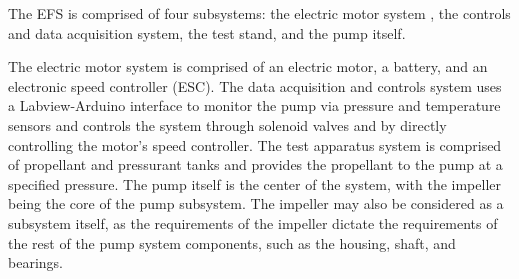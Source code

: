 \documentclass[11pt,twoside,a4paper,openright]{report}
\begin{document}
\begin{table}[!h]
\caption{Screening matrix for housing type selection}
\end{table}

\vspace{12pt}
The EFS is comprised of four subsystems: the electric motor system , the controls and data acquisition system, the test stand, and the pump itself. \par
\vspace{12pt}
	The electric motor system is comprised of an electric motor, a battery, and an electronic speed controller (ESC). The data acquisition and controls system uses a Labview-Arduino interface to monitor the pump via pressure and temperature sensors and controls the system through solenoid valves and by directly controlling the motor’s speed controller. The test apparatus system is comprised of propellant and pressurant tanks and provides the propellant to the pump at a specified pressure. The pump itself is the center of the system, with the impeller being the core of the pump subsystem. The impeller may also be considered as a subsystem itself, as the requirements of the impeller dictate the requirements of the rest of the pump system components, such as the housing, shaft, and bearings.\par
\vspace{12pt}
\end{document}
